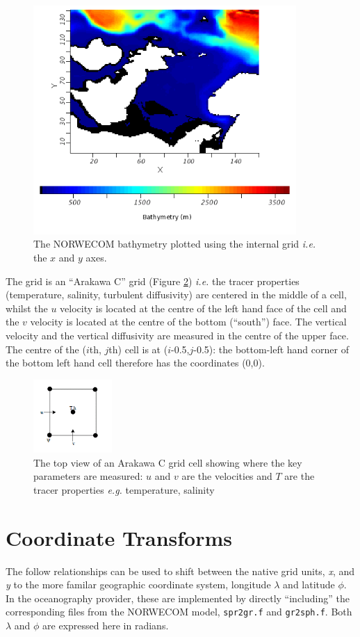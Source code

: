 \documentclass[a4paper,10pt]{article}
\begin{document}
\begin{figure}[t]
 \includegraphics[width=100mm]{figures/NORWECOM_bath.png}
 \centering
 \caption{\label{fig:NORWECOM_topo}The NORWECOM bathymetry plotted using the internal grid \textit{i.e.} the $x$ and $y$ axes.}
\end{figure}

The grid is an ``Arakawa C'' grid (Figure \ref{fig:Arakawa_C}) \textit{i.e.} the tracer properties (temperature, salinity, turbulent diffusivity) are centered in the middle of a cell, whilst the $u$ velocity is located at the centre of the left hand face of the cell and the $v$ velocity is located at the centre of the bottom (``south'') face. The vertical velocity and the vertical diffusivity are measured in the centre of the upper face. The centre of the ($i$th, $j$th) cell is at ($i$-0.5,$j$-0.5): the bottom-left hand corner of the bottom left hand cell therefore has the coordinates (0,0).

\begin{figure}[t]
 \centering
 \includegraphics[width=30mm]{figures/Arakawa_C_grid.png}
 \caption{ \label{fig:Arakawa_C}The top view of an Arakawa C grid cell showing where the key parameters are measured: $u$ and $v$ are the velocities and $T$ are the tracer properties \textit{e.g.} temperature, salinity}
\end{figure}

\section{Coordinate Transforms}
The follow relationships can be used to shift between the native grid units, \textit{x}, and \textit{y} to the more familar geographic coordinate system, longitude $\lambda$ and latitude $\phi$. In the oceanography provider, these are implemented by directly ``including'' the corresponding files from the NORWECOM model, \texttt{spr2gr.f} and \texttt{gr2sph.f}. Both $\lambda$ and $\phi$ are expressed here in radians.
\end{document}
